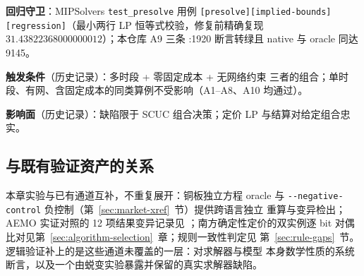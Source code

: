 \textbf{回归守卫}：MIPSolvers \texttt{test\_presolve} 用例
\texttt{[presolve][implied-bounds][regression]}（最小两行 LP 恒等式校验，修复前精确复现
$31.43822368000000012$）；本仓库 A9 三条 :1920 断言转绿且 native 与 oracle 同达 9145。

\textbf{触发条件}（历史记录）：多时段 + 零固定成本 + 无网络约束
三者的组合；单时段、有网、含固定成本的同类算例不受影响（A1--A8、A10 均通过）。

\textbf{影响面}（历史记录）：缺陷限于 SCUC 组合决策；定价 LP 与结算对给定组合忠实。

\subsection{与既有验证资产的关系}
本章实验与已有通道互补，不重复展开：铜板独立方程 oracle 与
\texttt{-{}-negative-control} 负控制（第~\ref{sec:market-xref}~节）提供跨语言独立
重算与变异检出；AEMO 实证对照的 12 项结果变异记录见
；南方确定性定价的双实例逐 bit
对偶比对见第~\ref{sec:algorithm-selection}~章；规则一致性判定见
第~\ref{sec:rule-gaps}~节。逻辑验证补上的是这些通道未覆盖的一层：对求解器与模型
本身数学性质的系统断言，以及一个由蜕变实验暴露并保留的真实求解器缺陷。
